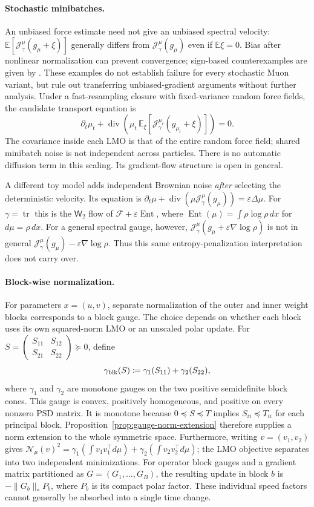 \documentclass{article}
\newcommand{\MF}{\mathcal{F}}
\newcommand{\MN}{\mathcal{N}}
\newcommand{\MJ}{\mathcal{J}}
\newcommand{\Wtwo}{\mathsf{W}_2}
\newcommand{\tr}{\operatorname{tr}}
\newcommand{\divv}{\operatorname{div}}
\begin{document}
\paragraph{Stochastic minibatches.}
An unbiased force estimate need not give an unbiased spectral velocity:
$\mathbb E[\MJ_\gamma^\mu(g_\mu+\xi)]$ generally differs from
$\MJ_\gamma^\mu(g_\mu)$ even if $\mathbb E\xi=0$. Bias after nonlinear
normalization can prevent convergence; sign-based counterexamples are given
by \citet{KarimireddyEtAl2019}. These examples do not establish failure for
every stochastic Muon variant, but rule out transferring unbiased-gradient
arguments without further analysis.
Under a fast-resampling closure with fixed-variance random force fields,
the candidate transport equation is
\[
 \partial_t\mu_t+\divv\!\left(
  \mu_t\,\mathbb E_\xi[\MJ_\gamma^{\mu_t}(g_{\mu_t}+\xi)]\right)=0.
\]
The covariance inside each LMO is that of the entire random force field;
shared minibatch noise is not independent across particles. There is no
automatic diffusion term in this scaling. Its gradient-flow structure is
open in general.

A different toy model adds independent Brownian noise \emph{after} selecting
the deterministic velocity. Its equation is
$\partial_t\mu+\divv(\mu\MJ_\gamma^\mu(g_\mu))
=\varepsilon\Delta\mu$.
For $\gamma=\tr$ this is the $\Wtwo$ flow of
$\MF+\varepsilon\operatorname{Ent}$, where
$\operatorname{Ent}(\mu)=\int\rho\log\rho\,dx$ for $d\mu=\rho\,dx$.
For a general spectral gauge, however,
$\MJ_\gamma^\mu(g_\mu+\varepsilon\nabla\log\rho)$ is not in general
$\MJ_\gamma^\mu(g_\mu)-\varepsilon\nabla\log\rho$.
Thus this same entropy-penalization interpretation does not carry over.

\paragraph{Block-wise normalization.}
For parameters $x=(u,v)$, separate normalization of the outer and inner
weight blocks corresponds to a block gauge. The choice depends on whether
each block uses its own squared-norm LMO or an unscaled polar update. For
$S=\left(\begin{smallmatrix}S_{11}&S_{12}\\ S_{21}&S_{22}\end{smallmatrix}\right)\succeq0$, define
$$
\gamma_{\rm blk}(S)\coloneqq \gamma_1(S_{11})+\gamma_2(S_{22}),
$$
where $\gamma_1$ and $\gamma_2$ are monotone gauges on the two positive
semidefinite block cones. This gauge is convex, positively homogeneous, and
positive on every nonzero PSD matrix. It is monotone because
$0\preceq S\preceq T$ implies $S_{ii}\preceq T_{ii}$ for each principal
block. Proposition~\ref{prop:gauge-norm-extension} therefore supplies a norm
extension to the whole symmetric space.
Furthermore, writing $v=(v_1,v_2)$ gives
$\MN_\mu(v)^2=\gamma_1(\int v_1v_1^\top d\mu)
+\gamma_2(\int v_2v_2^\top d\mu)$; the LMO objective separates into two
independent minimizations. For operator block gauges and a gradient matrix
partitioned as $G=(G_1,\ldots,G_B)$, the resulting update in block $b$ is
$-\|G_b\|_*P_b$, where $P_b$ is its compact polar factor. These individual
speed factors cannot generally be absorbed into a single time change.
\end{document}
